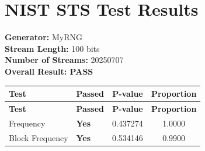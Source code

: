 \documentclass{article}
\begin{document}
\section*{NIST STS Test Results}
\textbf{Generator:} MyRNG \\
\textbf{Stream Length:} 100 bits \\
\textbf{Number of Streams:} 20250707 \\

\textbf{\textcolor{passgreen}{Overall Result: PASS}}

\begin{longtable}{llcc}
\toprule
\textbf{Test} & \textbf{Passed} & \textbf{P-value} & \textbf{Proportion} \\
\midrule
\endfirsthead
\toprule
\textbf{Test} & \textbf{Passed} & \textbf{P-value} & \textbf{Proportion} \\
\midrule
\endhead
\bottomrule
\endfoot

Frequency & \textcolor{passgreen}{\textbf{Yes}} & 0.437274 & 1.0000 \\
Block Frequency & \textcolor{passgreen}{\textbf{Yes}} & 0.534146 & 0.9900 \\

\end{longtable}
\end{document}

